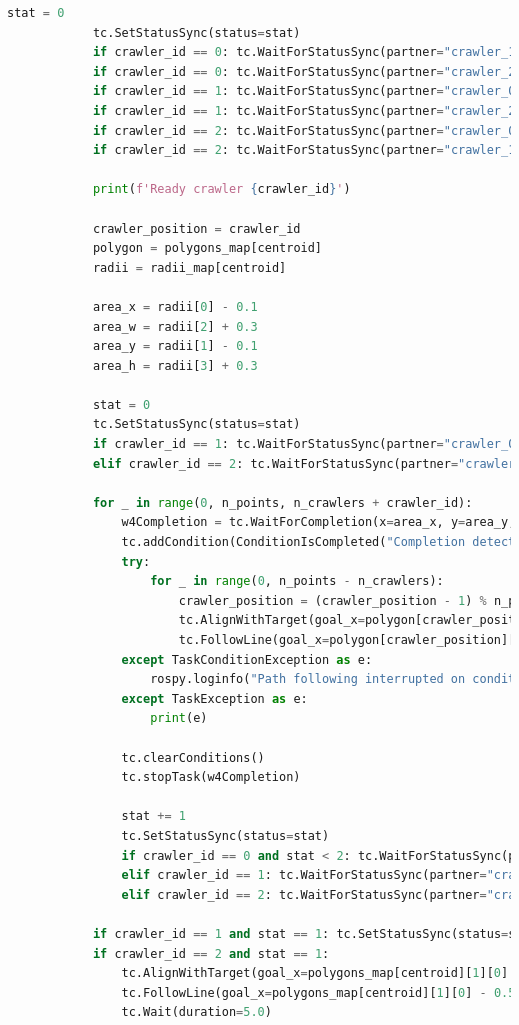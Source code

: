 \documentclass[francais,RandD]{rapportPFE}
\begin{document}
\begin{lstlisting}[language=Python,caption={Implémentation de l'algorithme d'investigation polygonale},label=lst:investigation_polygonale]
			stat = 0
			tc.SetStatusSync(status=stat)
			if crawler_id == 0: tc.WaitForStatusSync(partner="crawler_1", status=stat)
			if crawler_id == 0: tc.WaitForStatusSync(partner="crawler_2", status=stat)
			if crawler_id == 1: tc.WaitForStatusSync(partner="crawler_0", status=stat)
			if crawler_id == 1: tc.WaitForStatusSync(partner="crawler_2", status=stat)
			if crawler_id == 2: tc.WaitForStatusSync(partner="crawler_0", status=stat)
			if crawler_id == 2: tc.WaitForStatusSync(partner="crawler_1", status=stat)

			print(f'Ready crawler {crawler_id}')

			crawler_position = crawler_id
			polygon = polygons_map[centroid]
			radii = radii_map[centroid]

			area_x = radii[0] - 0.1
			area_w = radii[2] + 0.3
			area_y = radii[1] - 0.1
			area_h = radii[3] + 0.3

			stat = 0
			tc.SetStatusSync(status=stat)
			if crawler_id == 1: tc.WaitForStatusSync(partner="crawler_0", status=stat+1)
			elif crawler_id == 2: tc.WaitForStatusSync(partner="crawler_1", status=stat+1)

			for _ in range(0, n_points, n_crawlers + crawler_id):
				w4Completion = tc.WaitForCompletion(x=area_x, y=area_y, w=area_w, h=area_h, foreground=False)
				tc.addCondition(ConditionIsCompleted("Completion detector", tc, w4Completion))
				try:
					for _ in range(0, n_points - n_crawlers):
						crawler_position = (crawler_position - 1) % n_points
						tc.AlignWithTarget(goal_x=polygon[crawler_position][0], goal_y=polygon[crawler_position][1])
						tc.FollowLine(goal_x=polygon[crawler_position][0], goal_y=polygon[crawler_position][1], max_velocity=investigation_velocity)
				except TaskConditionException as e:
					rospy.loginfo("Path following interrupted on condition: %s" % " or ".join([str(c) for c in e.conditions]))
				except TaskException as e:
					print(e)

				tc.clearConditions()
				tc.stopTask(w4Completion)

				stat += 1
				tc.SetStatusSync(status=stat)
				if crawler_id == 0 and stat < 2: tc.WaitForStatusSync(partner="crawler_2", status=stat)
				elif crawler_id == 1: tc.WaitForStatusSync(partner="crawler_0", status=stat+1)
				elif crawler_id == 2: tc.WaitForStatusSync(partner="crawler_1", status=stat+1)

			if crawler_id == 1 and stat == 1: tc.SetStatusSync(status=stat+1)
			if crawler_id == 2 and stat == 1:
				tc.AlignWithTarget(goal_x=polygons_map[centroid][1][0] - 0.5, goal_y=polygons_map[centroid][1][1] + 0.5, angle_threshold=0.05)
				tc.FollowLine(goal_x=polygons_map[centroid][1][0] - 0.5, goal_y=polygons_map[centroid][1][1] + 0.5, max_velocity=cruise_velocity)
				tc.Wait(duration=5.0)


\end{lstlisting}
\end{document}
